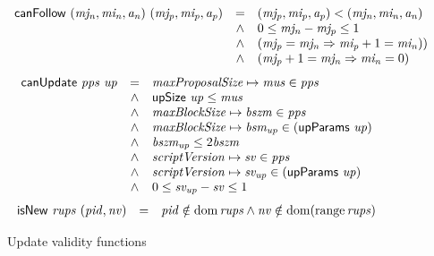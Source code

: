 \begin{figure}[htb]
  \begin{equation}
    \label{eq:func:can-follow}
    \begin{array}{r c l}
      \mathsf{canFollow}~(\mathit{mj_n}, \mathit{mi_n}, \mathit{a_n})~(\mathit{mj_p}, \mathit{mi_p}, \mathit{a_p})
      & = & (\mathit{mj_p}, \mathit{mi_p}, \mathit{a_p}) < (\mathit{mj_n}, \mathit{mi_n}, \mathit{a_n})\\
      & \wedge & 0 \leq \mathit{mj_n} - \mathit{mj_p} \leq 1\\
      & \wedge & (\mathit{mj_p} = \mathit{mj_n} \Rightarrow \mathit{mi_p} + 1 = \mathit{mi_n}))\\
      & \wedge & (\mathit{mj_p} + 1 = \mathit{mj_n} \Rightarrow \mathit{mi_n} = 0)
    \end{array}
  \end{equation}
  \nextdef
  \begin{equation}
    \label{eq:func:can-update}
    \begin{array}{r c l}
      \mathsf{canUpdate}~\mathit{pps}~\mathit{up}
      & = & \mathit{maxProposalSize} \mapsto \mathit{mus} \in \mathit{pps}\\
      & \wedge & \mathsf{upSize}~\mathit{up} \leq \mathit{mus}\\
      & \wedge & \mathit{maxBlockSize} \mapsto \mathit{bszm} \in \mathit{pps}\\
      & \wedge & \mathit{maxBlockSize} \mapsto \mathit{bsm_{up}} \in (\mathsf{upParams}~\mathit{up})\\
      & \wedge & \mathit{bszm_{up}} \leq 2\mathit{bszm}\\
      & \wedge & \mathit{scriptVersion} \mapsto \mathit{sv} \in \mathit{pps} \\
      & \wedge & \mathit{scriptVersion} \mapsto \mathit{sv_{up}} \in (\mathsf{upParams}~\mathit{up}) \\
      & \wedge &  0 \leq \mathit{sv_{up}} - \mathit{sv} \leq 1
    \end{array}
  \end{equation}
  \nextdef
  \begin{equation}
    \label{eq:func:is-new}
    \begin{array}{r c l}
      \mathsf{isNew}~\mathit{rups}~(\mathit{pid}, \mathit{nv})
      & = &  \mathit{pid} \notin \operatorname{dom} \mathit{rups}
            \wedge \mathit{nv} \notin \operatorname{dom} (\operatorname{range} \mathit{rups})\\
    \end{array}
  \end{equation}
  \caption{Update validity functions}
\end{figure}

